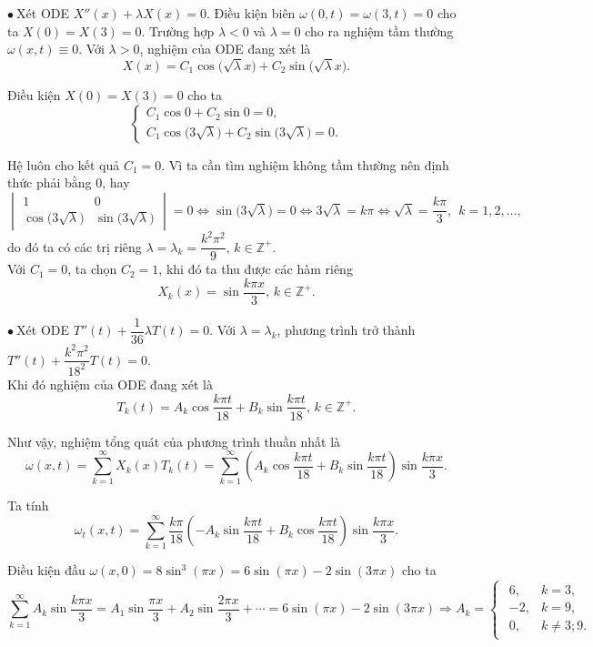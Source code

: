 \documentclass[10pt, a4paper]{article}
\begin{document}
	$\bullet~$Xét ODE $X''(x)+\lambda X(x)=0$. Điều kiện biên $\omega(0,t)=\omega(3,t)=0$ cho ta $X(0)=X(3)=0$. Trường hợp $\lambda<0$ và $\lambda=0$ cho ra nghiệm tầm thường $\omega(x,t)\equiv0$. Với $\lambda>0$, nghiệm của ODE đang xét là $$X(x)=C_1\cos\big(\sqrt\lambda x\big)+C_2\sin\big(\sqrt\lambda x\big).$$
	
	Điều kiện $X(0)=X(3)=0$ cho ta $$\begin{cases}
		C_1\cos0+C_2\sin0=0,\\
		C_1\cos\big(3\sqrt\lambda\big)+C_2\sin\big(3\sqrt\lambda\big)=0.
	\end{cases}$$
	
	Hệ luôn cho kết quả $C_1=0$. Vì ta cần tìm nghiệm không tầm thường nên định thức phải bằng 0, hay $$\begin{vmatrix}
		1&0\\
		\cos\big(3\sqrt\lambda\big)&\sin\big(3\sqrt\lambda\big)
	\end{vmatrix}=0\iff\sin\big(3\sqrt\lambda\big)=0\iff3\sqrt\lambda=k\pi\iff\sqrt\lambda=\frac{k\pi}{3},~~k=1,2,\ldots,$$
	do đó ta có các trị riêng $\lambda=\lambda_k=\dfrac{k^2\pi^2}{9},\,k\in\mathbb Z^+$.\\
	
	Với $C_1=0$, ta chọn $C_2=1$, khi đó ta thu được các hàm riêng $$X_k(x)=\sin\frac{k\pi x}{3},\,k\in\mathbb Z^+.$$
	
	$\bullet~$Xét ODE $T''(t)+\dfrac{1}{36}\lambda T(t)=0$. Với $\lambda=\lambda_k$, phương trình trở thành $T''(t)+\dfrac{k^2\pi^2}{18^2}T(t)=0$.\\
	
	Khi đó nghiệm của ODE đang xét là $$T_k(t)=A_k\cos\frac{k\pi t}{18}+B_k\sin\frac{k\pi t}{18},\,k\in\mathbb Z^+.$$
	
	Như vậy, nghiệm tổng quát của phương trình thuần nhất là $$\omega(x,t)=\sum_{k=1}^\infty X_k(x)T_k(t)=\sum_{k=1}^\infty\left(A_k\cos\frac{k\pi t}{18}+B_k\sin\frac{k\pi t}{18}\right)\sin\frac{k\pi x}{3}.$$
	
	Ta tính $$\omega_t(x,t)=\sum_{k=1}^\infty\frac{k\pi}{18}\left(-A_k\sin\frac{k\pi t}{18}+B_k\cos\frac{k\pi t}{18}\right)\sin\frac{k\pi x}{3}.$$
	
	Điều kiện đầu $\omega(x,0)=8\sin^3(\pi x)=6\sin(\pi x)-2\sin(3\pi x)$ cho ta $$\sum_{k=1}^\infty A_k\sin\frac{k\pi x}{3}=A_1\sin\frac{\pi x}{3}+A_2\sin\frac{2\pi x}{3}+\cdots=6\sin(\pi x)-2\sin(3\pi x)\Rightarrow A_k=\begin{cases}
		\begin{array}{ll}
			6, & k=3, \\
			-2, & k=9, \\
			0, & k\ne3;9.
		\end{array}
	\end{cases}$$
	
\end{document}
